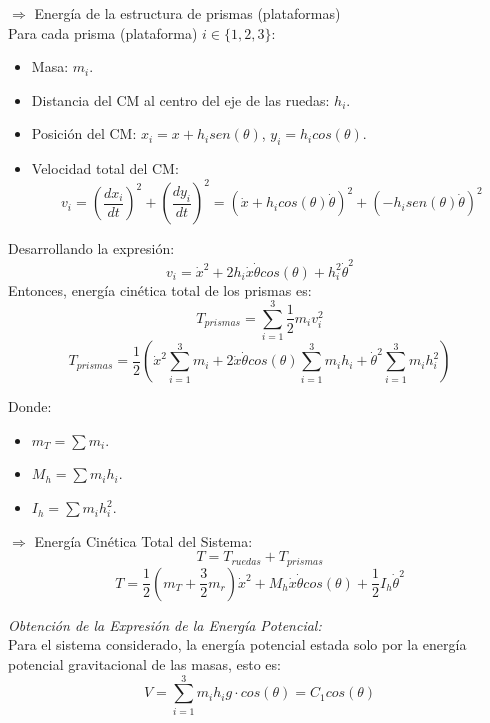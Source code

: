 \documentclass[final,times,twocolumn,5p]{ResumenEjecutivo}
\begin{document}
$\Rightarrow$ Energía de la estructura de prismas (plataformas)\\
Para cada prisma (plataforma) $i\in \{1,2,3\}:$\\
\vspace{-0.6cm}
\begin{itemize}
    \item  Masa: $m_i$.
    \vspace{-0.2cm}
    \item Distancia del CM al centro del eje de las ruedas: $h_i$.
    \vspace{-0.2cm}
    \item Posición del CM: $x_i=x+h_isen(\theta)$, $y_i=h_icos(\theta)$.
    \vspace{-0.2cm}
    \item Velocidad total del CM:
    \[
    v_i = \displaystyle\left(\frac{dx_i}{dt}\right)^2+\left(\frac{dy_i}{dt}\right)^2= \left(\dot{x}+h_icos(\theta)\dot{\theta}\right)^2+\left(-h_isen(\theta)\dot{\theta}\right)^2
\]
\end{itemize}
Desarrollando la expresión: 
\[
v_i = \displaystyle\dot{x}^2+2h_i\dot{x}\dot{\theta}cos(\theta)+h_i^2\dot{\theta}^2
\]
Entonces, energía cinética total de los prismas es:
\[
T_{prismas} = \displaystyle\sum^3_{i=1}\frac{1}{2}m_iv_i^2
\]
\[
T_{prismas} = \displaystyle\frac{1}{2}\left(\dot{x}^2\sum^3_{i=1}m_i+2\dot{x}\dot{\theta}cos(\theta)\sum^3_{i=1}m_ih_i+\dot{\theta}^2\sum^3_{i=1}m_ih_i^2\right)
\]

Donde: \\
\vspace{-0.6cm}
\begin{itemize}
    \item $m_T=\sum m_i$.
    \vspace{-0.2cm}
    \item $M_h=\sum m_ih_i$.
    \vspace{-0.2cm}
    \item $I_h=\sum m_ih_i^2$.
\end{itemize}

$\Rightarrow$ Energía Cinética Total del Sistema:\\
\[
T = T_{ruedas}+T_{prismas}
\]
\[
T = \displaystyle\frac{1}{2}\left(m_T+\frac{3}{2}m_r\right)\dot{x}^2+M_h\dot{x}\dot{\theta}cos(\theta)+\frac{1}{2}I_h\dot{\theta}^2
\]

\textit{Obtención de la Expresión de la Energía Potencial:}\\

Para el sistema considerado, la energía potencial estada solo por la energía potencial gravitacional de las masas, esto es:
\[
V = \displaystyle\sum^3_{i=1}m_ih_ig\cdot cos(\theta)=C_1cos(\theta)
\]
\end{document}

